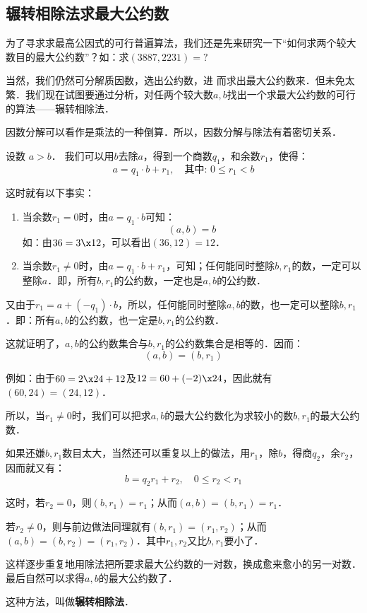 \subsection{辗转相除法求最大公约数}

为了寻求求最高公因式的可行普遍算法，我们还是先来研究一下“如何求两个较大数目的最大公约数”？如：求$(3887, 2231)=?$

当然，我们仍然可分解质因数，选出公约数，进
而求出最大公约数来．但未免太繁．我们现在试图要通过分析，对任两个较大数$a,b$找出一个求最大公约数的可行的算法——辗转相除法．

\begin{analyze}
 因数分解可以看作是乘法的一种倒算．所以，因数分解与除法有着密切关系．

设数 $a>b$． 我们可以用$b$去除$a$，得到一个商数$q_1$，和余数$r_1$，使得：
$$a=q_1\cdot b+r_1,\quad \text{其中: }0\le r_1<b$$

这时就有以下事实：
\begin{enumerate}
    \item 当余数$r_1=0$时，由$a=q_1\cdot b$可知：
    \[(a,b) =b\]
    如：由$36=3\x12$，可以看出$(36, 12)=12$．

\item 当余数$r_1\ne 0$时，由$a=q_1\cdot b+r_1$，可知；任何能同时整除$b,r_1$的数，一定可以整除$a$．即，所有$b,r_1$的公约数，一定也是$a,b$的公约数．
\end{enumerate}

又由于$r_1=a+(-q_1)\cdot b$，所以，任何能同时整除$a,b$的数，也一定可以整除$b,r_1$．即：所有$a,b$的公约数，也一定是$b,r_1$的公约数．

这就证明了，$a,b$的公约数集合与$b,r_1$的公约数集合是相等的．因而：   
\[(a,b)=(b,r_1)  \]

例如：由于$60=2\x 24+12$及$12=60+(-2)\x 24$，因此就有$(60,24)=(24,12)$．

所以，当$r_1\ne 0$时，我们可以把求$a,b$的最大公约数化为求较小的数$b,r_1$的最大公约数．

如果还嫌$b,r_1$数目太大，当然还可以重复以上的做法，用$r_1$，除$b$，得商$q_2$，余$r_2$，因而就又有：
\[b=q_2r_1 +r_2,\quad  0\le r_2<r_1\]

这时，若$r_2=0$，则$(b,r_1)=r_1$；从而$(a,b)= (b,r_1) =r_1$．

若$r_2\ne 0$，则与前边做法同理就有$(b,r_1)=(r_1, r_2)$；从而$(a,b)=(b,r_2)=(r_1,r_2)$．其中$r_1,r_2$又比$b,r_1$要小了．

这样逐步重复地用除法把所要求最大公约数的一对数，换成愈来愈小的另一对数．最后自然可以求得$a,b$的最大公约数了．

这种方法，叫做\textbf{辗转相除法}．
\end{analyze}


